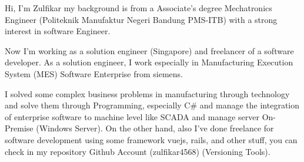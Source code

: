 

\begin{cvparagraph}

Hi, I'm Zulfikar my background is from a Associate's degree Mechatronics Engineer (Politeknik Manufaktur Negeri Bandung PMS-ITB) with a strong interest in software Engineer. 

Now I'm working as a solution engineer (Singapore) and freelancer of a software developer. As a solution engineer, I work especially in Manufacturing Execution System (MES) Software Enterprise from siemens. 

I solved some complex business problems in manufacturing through technology and solve them through Programming, especially C\# and manage the integration of enterprise software to machine level like SCADA and manage server On-Premise (Windows Server). On the other hand, also I've done freelance for software development using some framework vuejs, rails, and other stuff, you can check in my repository Github Account (zulfikar4568) (Versioning Tools).
\end{cvparagraph}
